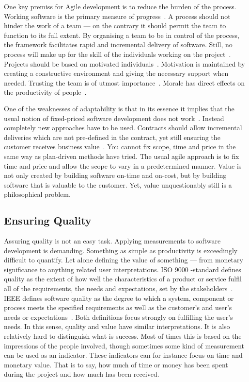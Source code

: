 \documentclass[english]{tktltiki2}
\begin{document}
One key premiss for Agile development is to reduce the burden of the process. Working software is the primary measure of progress~\cite{BBB01b}. A process should not hinder the work of a team — on the contrary it should permit the team to function to its full extent. By organising a team to be in control of the process, the framework facilitates rapid and incremental delivery of software. Still, no process will make up for the skill of the individuals working on the project~\cite{Boe88, Fow05}. Projects should be based on motivated individuals~\cite{BBB01b}. Motivation is maintained by creating a constructive environment and giving the necessary support when needed. Trusting the team is of utmost importance~\cite{BBB01b}. Morale has direct effects on the productivity of people~\cite{Fow05, LTR14}.

One of the weaknesses of adaptability is that in its essence it implies that the usual notion of fixed-priced software development does not work~\cite{Pop02, TFR02, Fow05, HAB12}. Instead completely new approaches have to be used. Contracts should allow incremental deliveries which are not pre-defined in the contract, yet still ensuring the customer receives business value~\cite{Pop02}. You cannot fix scope, time and price in the same way as plan-driven methods have tried. The usual agile approach is to fix time and price and allow the scope to vary in a predetermined manner. Value is not only created by building software on-time and on-cost, but by building software that is valuable to the customer. Yet, value unquestionably still is a philosophical problem.

\subsection{Ensuring Quality}

Assuring quality is not an easy task. Applying measurements to software development is demanding. Something as simple as productivity is exceedingly difficult to quantify. Let alone defining the value of something — from monetary significance to anything related user interpretations. ISO 9000 -standard defines quality as the extent of how well the characteristics of a product or service fulfil all of the requirements, the needs and expectations, set by the stakeholders~\cite{ISO9000}. IEEE defines software quality as the degree to which a system, component or process meets the specified requirements as well as the customer’s and user’s needs or expectations~\cite{IEEE1074}. Both definitions focus strongly on fulfilling the user’s needs. In this sense, quality and value have similar interpretations. It is also relatively hard to distinguish what is success. Most of times this is based on the impressions of the people involved, though sometimes some kind of measurement can be used as an indicator. These indicators can for instance focus on time and monetary value. That is to say, how much of time or money has been spent during the project and how much has been received.
\end{document}
